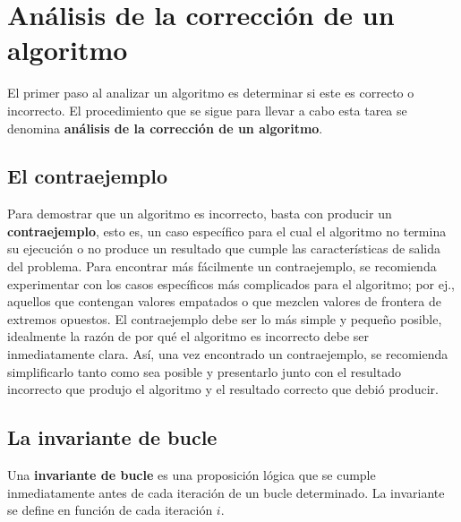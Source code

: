 \chapter{Análisis de la corrección de un algoritmo}

El primer paso al analizar un algoritmo es determinar si este es correcto o incorrecto. 
El procedimiento que se sigue para llevar a cabo esta tarea se denomina \textbf{análisis de la corrección de un algoritmo}.

\section{El contraejemplo}




Para demostrar que un algoritmo es incorrecto, basta con producir un \textbf{contraejemplo}, esto es, un caso específico para el cual el algoritmo no termina su ejecución o no produce un resultado que cumple las características de salida del problema.
Para encontrar más fácilmente un contraejemplo, se recomienda experimentar con los casos específicos más complicados para el algoritmo; por ej., aquellos que contengan valores empatados o que mezclen valores de frontera de extremos opuestos.
El contraejemplo debe ser lo más simple y pequeño posible, idealmente la razón de por qué el algoritmo es incorrecto debe ser inmediatamente clara. 
Así, una vez encontrado un contraejemplo, se recomienda simplificarlo tanto como sea posible y presentarlo junto con el resultado incorrecto que produjo el algoritmo y el resultado correcto que debió producir.

\section{La invariante de bucle}

Una \textbf{invariante de bucle} es una proposición lógica que se cumple inmediatamente antes de cada iteración de un bucle determinado. 
La invariante se define en función de cada iteración \(i\).

